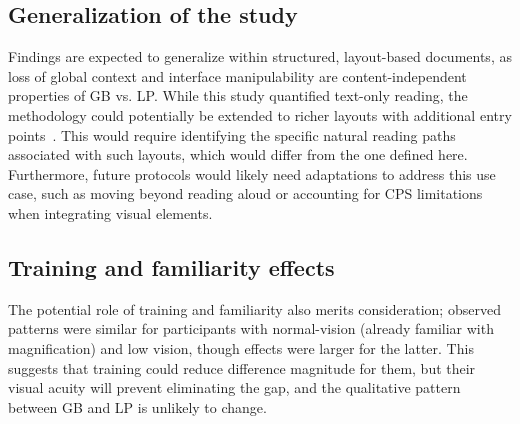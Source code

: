 \subsection*{Generalization of the study}

Findings are expected to generalize within structured, layout-based documents, as loss of global context and interface manipulability are content-independent properties of GB vs. LP.
While this study quantified text-only reading, the methodology could potentially be extended to richer layouts with additional entry points~\cite{ozretic_dosen_key_2018}. This would require identifying the specific natural reading paths associated with such layouts, which would differ from the one defined here. Furthermore, future protocols would likely need adaptations to address this use case, such as moving beyond reading aloud or accounting for CPS limitations when integrating visual elements.

\subsection*{Training and familiarity effects}

The potential role of training and familiarity also merits consideration; observed patterns were similar for participants with normal-vision (already familiar with magnification) and low vision, though effects were larger for the latter. This suggests that training could reduce difference magnitude for them, but their visual acuity will prevent eliminating the gap, and the qualitative pattern between GB and LP is unlikely to change.
